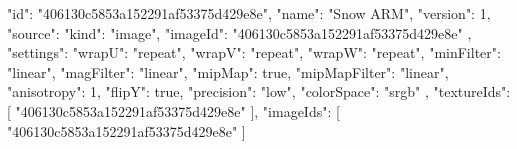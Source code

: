 {
  "id": "406130c5853a152291af53375d429e8e",
  "name": "Snow ARM",
  "version": 1,
  "source": {
    "kind": "image",
    "imageId": "406130c5853a152291af53375d429e8e"
  },
  "settings": {
    "wrapU": "repeat",
    "wrapV": "repeat",
    "wrapW": "repeat",
    "minFilter": "linear",
    "magFilter": "linear",
    "mipMap": true,
    "mipMapFilter": "linear",
    "anisotropy": 1,
    "flipY": true,
    "precision": "low",
    "colorSpace": "srgb"
  },
  "textureIds": [
    "406130c5853a152291af53375d429e8e"
  ],
  "imageIds": [
    "406130c5853a152291af53375d429e8e"
  ]
}
